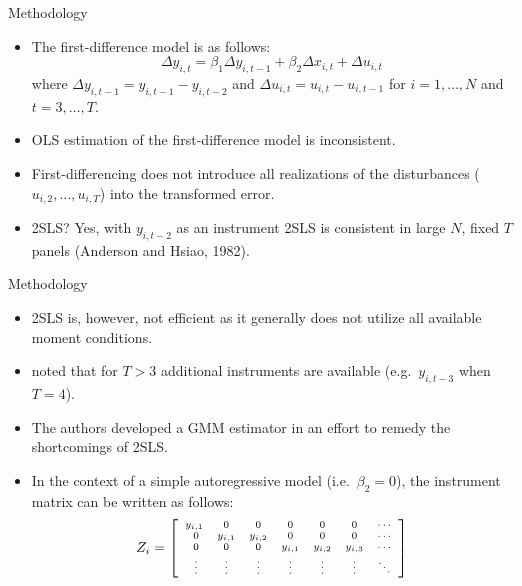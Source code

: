 \documentclass[xcolor=dvipsnames]{beamer}
\begin{document}
\begin{frame}{Methodology}
\begin{itemize}
\item The first-difference model is as follows:
\begin{equation*}
\Delta y_{i,t} = \beta_1 \Delta y_{i,t-1} + \beta_2 \Delta x_{i,t} 
+ \Delta u_{i,t}
\end{equation*}
where $\Delta y_{i,t-1}= y_{i,t-1} - y_{i,t-2}$ and $\Delta u_{i,t} = 
u_{i,t} - u_{i,t-1}$ for $i=1,\ldots,N$ and $t=3,\ldots,T$.
\par\pause\noindent \item OLS estimation of the first-difference model 
is inconsistent.
\par\pause\noindent \item First-differencing does not introduce all 
realizations of the disturbances ($u_{i,2}, \ldots, u_{i,T}$) into the 
transformed error. 
\par\pause\noindent \item 2SLS? Yes, with $y_{i, t-2}$ as an instrument 
2SLS is consistent in large $N$, fixed $T$ panels 
(Anderson and Hsiao, 1982).
\end{itemize}
\end{frame}

\begin{frame}{Methodology}
\begin{itemize}
\item 2SLS is, however, not efficient as it generally does not utilize all 
available moment conditions.
\par\pause\noindent \item \citet{arellano1991} noted that for $T>3$ 
additional instruments are available (e.g.\ $y_{i, t-3}$ when $T=4$).
\par\pause\noindent \item The authors developed a GMM estimator in 
an effort to remedy the shortcomings of 2SLS.
\par\pause\noindent \item In the context of a simple autoregressive 
model (i.e.\ $\beta_2=0$), the instrument matrix can be written as follows:
\begin{equation*}
Z_i = \left[ 
\scriptsize
\begin{array}{ccccccc}
y_{i,1} & 0 & 0 & 0 & 0 & 0 & \cdots   \\\
0 & y_{i,1} & y_{i,2} & 0 & 0 & 0 & \cdots   \\\
0 & 0 & 0 & y_{i,1} & y_{i,2} & y_{i,3} & \cdots  \\\
\vdots & \vdots & \vdots & \vdots & \vdots & \vdots & \ddots
\end{array}
\right] 
\end{equation*}
\end{itemize}
\end{frame}
\end{document}
